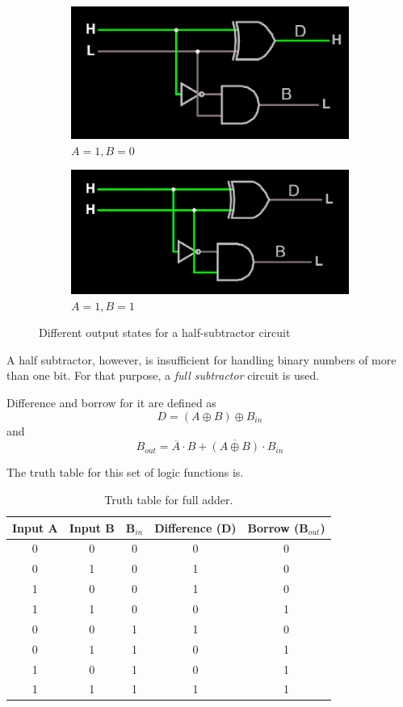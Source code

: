 \documentclass{article}
\begin{document}
\begin{figure}[H]
		\begin{subfigure}[b]{0.4\textwidth}
			\centering
			\includegraphics[width=\textwidth]{half_sub/half_sub_10.png}
			\caption{$A=1, B=0$}
		\end{subfigure}
		\begin{subfigure}[b]{0.4\textwidth}
			\includegraphics[width=\textwidth]{half_sub/half_sub_11.png}
			\caption{$A=1, B=1$}
		\end{subfigure}
		\caption{Different output states for a half-subtractor circuit}
		\label{fig:halfsub}
	\end{figure}
	
	A half subtractor, however, is insufficient for handling binary numbers of more than one bit. For that purpose, a \textit{full subtractor} circuit is used.
	
	Difference and borrow for it are defined as $$D = (A \oplus B) \oplus B_{in}$$ and $$B_{out} = \overline{A}\cdot B + \overline{(A\oplus B)}\cdot B_{in}$$
	
	The truth table for this set of logic functions is.
	\begin{table}[H]
		\centering
		\begin{tabular}{|c|c|c|c|c|}
			\hline
			Input A & Input B & B$_{in}$ & Difference (D) & Borrow (B$_{out}$)\\
			\hline 
			0 & 0 & 0 & 0 & 0\\
			0 & 1 & 0 & 1 & 0\\
			1 & 0 & 0 & 1 & 0\\
			1 & 1 & 0 & 0 & 1\\
			\hline
			0 & 0 & 1 & 1 & 0\\
			0 & 1 & 1 & 0 & 1\\
			1 & 0 & 1 & 0 & 1\\
			1 & 1 & 1 & 1 & 1\\
			\hline
		\end{tabular}
		\caption{Truth table for full adder.}
	\end{table}
	
\end{document}
